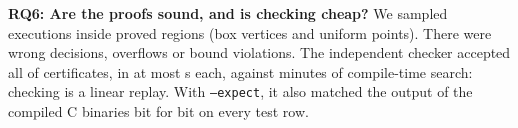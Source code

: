 \textbf{RQ6: Are the proofs sound, and is checking cheap?} We sampled \FCAuditSamples{} executions inside proved regions (box vertices and uniform points). There were \FCAuditViolations{} wrong decisions, overflows or bound violations. The independent checker accepted all \FCCheckerValid{} of \FCCheckerTotal{} certificates, in at most \FCCheckerMaxSeconds{} s each, against minutes of compile-time search: checking is a linear replay. With \texttt{--expect}, it also matched the output of the compiled C binaries bit for bit on every test row.
